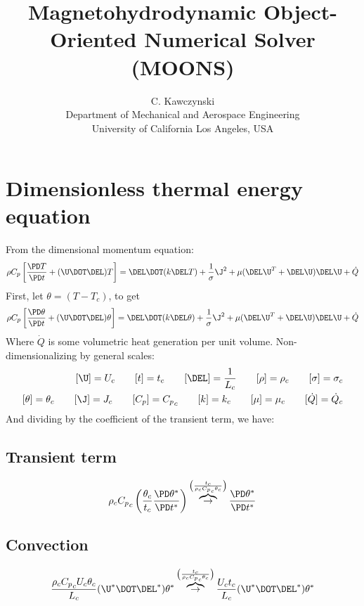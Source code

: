 \documentclass[11pt]{article}
\newcommand{\OB}{\overbrace{\rightarrow}^{\left(\frac{t_c}{\rho_c {C_p}_c \theta_c}\right)}}
\newcommand{\Cp}{{C_p}_c}
\begin{document}
\doublespacing
\title{Magnetohydrodynamic Object-Oriented Numerical Solver (MOONS)}
\author{C. Kawczynski \\
Department of Mechanical and Aerospace Engineering \\
University of California Los Angeles, USA\\
}
\maketitle

\section{Dimensionless thermal energy equation}
From the dimensional momentum equation:
\begin{equation}
	\rho C_p \left[ \frac{\PD T}{\PD t}
	+ (\U \DOT \DEL) T \right]
	= \DEL \DOT (k \DEL T)
	+ \frac{1}{\sigma} \J^2
	+ \mu ( \DEL \U^T + \DEL \U ) \DEL \U
	+ \dot{Q}
\end{equation}
First, let $\theta = (T - T_c)$, to get
\begin{equation}
	\rho C_p \left[ \frac{\PD \theta}{\PD t}
	+ (\U \DOT \DEL) \theta \right]
	= \DEL \DOT (k \DEL \theta)
	+ \frac{1}{\sigma} \J^2
	+ \mu ( \DEL \U^T + \DEL \U ) \DEL \U
	+ \dot{Q}
\end{equation}
Where $\dot{Q}$ is some volumetric heat generation per unit volume. Non-dimensionalizing by general scales:
\begin{equation}\begin{aligned}
	[\U] = U_c \qquad
	[t] = t_c \qquad
	[\DEL] = \frac{1}{L_c} \qquad
	[\rho] = \rho_c \qquad
	[\sigma] = \sigma_c \\
	[\theta] = \theta_c \qquad
	[\J] = J_c \qquad
	[C_p] = \Cp \qquad
	[k] = k_c \qquad
	[\mu] = \mu_c \qquad
	[\dot{Q}] = \dot{Q}_c
\end{aligned}\end{equation}
And dividing by the coefficient of the transient term, we have:
\subsection{Transient term}
\begin{equation}
	\rho_c \Cp \left( \frac{\theta_c}{t_c} \frac{\PD \theta^*}{\PD t^*} \right)
	\OB
	\frac{\PD \theta^*}{\PD t^*}
\end{equation}
\subsection{Convection}
\begin{equation}
	\frac{\rho_c \Cp U_c \theta_c}{L_c} (\U^* \DOT \DEL^*) \theta^*
	\OB
	\frac{U_c t_c}{L_c} (\U^* \DOT \DEL^*) \theta^*
\end{equation}
\end{document}
